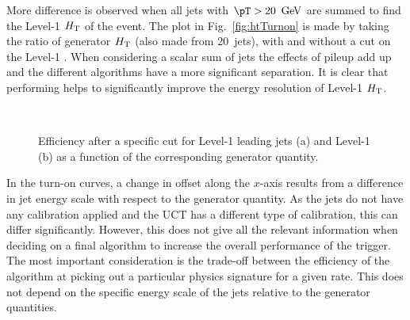 More difference is observed when all jets with $\pT>20~\gev$ are
summed to find the Level-1 $\mbox{$H_\text{T}$}$ of the event. The plot in
Fig.~\ref{fig:htTurnon} is made by taking the ratio of generator $\mbox{$H_\text{T}$}$
(also made from 20~\gev jets), with and without a cut on the Level-1
\HT. When considering a scalar sum of jets the effects of pileup
add up and the different algorithms have a more significant
separation. It is clear that performing \PUS helps to significantly
improve the energy resolution of Level-1 $\mbox{$H_\text{T}$}$.
\begin{figure}
  \centering
  ~
  \caption{ Efficiency after a specific cut for Level-1 leading jets (a) and Level-1 \HT
  (b) as a function of the corresponding generator quantity.
  } \label{fig:turnons}
\end{figure}

In the turn-on curves, a change in offset along the $x$-axis results
from a difference in jet energy scale with respect to the generator
quantity. As the \GCT jets do not have any calibration applied and the
UCT has a different type of calibration, this can differ
significantly. However, this does not give all the relevant
information when deciding on a final algorithm to increase the overall
performance of the trigger. The most important consideration is the
trade-off between the efficiency of the algorithm at picking out a
particular physics signature for a given rate. This does not depend on
the specific energy scale of the jets relative to the generator
quantities.


